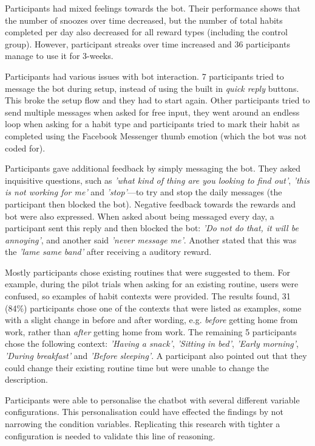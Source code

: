 Participants had mixed feelings towards the bot. Their performance shows that the number of snoozes over time decreased, but the number of total habits completed per day also decreased for all reward types (including the control group). However, participant streaks over time increased and 36 participants manage to use it for 3-weeks.

Participants had various issues with bot interaction. 7 participants tried to message the bot during setup, instead of using the built in \textit{quick reply} buttons. This broke the setup flow and they had to start again. Other participants tried to send multiple messages when asked for free input, they went around an endless loop when asking for a habit type and participants tried to mark their habit as completed using the Facebook Messenger thumb emotion (which the bot was not coded for).

Participants gave additional feedback by simply messaging the bot. They asked inquisitive questions, such as \textit{'what kind of thing are you looking to find out'}, \textit{'this is not working for me'} and \textit{'stop'}---to try and stop the daily messages (the participant then blocked the bot). Negative feedback towards the rewards and bot were also expressed. When asked about being messaged every day, a participant sent this reply and then blocked the bot: \textit{'Do not do that, it will be annoying'}, and another said \textit{'never message me'}. Another stated that this was the \textit{'lame same band'} after receiving a auditory reward.

Mostly participants chose existing routines that were suggested to them. For example, during the pilot trials when asking for an existing routine, users were confused, so examples of habit contexts were provided. The results found, 31 (84\%) participants chose one of the contexts that were listed as examples, some with a slight change in before and after wording, e.g. \textit{before} getting home from work, rather than \textit{after} getting home from work. The remaining 5 participants chose the following context: \textit{'Having a snack'}, \textit{'Sitting in bed'}, \textit{'Early morning'}, \textit{'During breakfast'} and \textit{'Before sleeping'}. A participant also pointed out that they could change their existing routine time but were unable to change the description.

Participants were able to personalise the chatbot with several different variable configurations. This personalisation could have effected the findings by not narrowing the condition variables. Replicating this research with tighter a configuration is needed to validate this line of reasoning.


